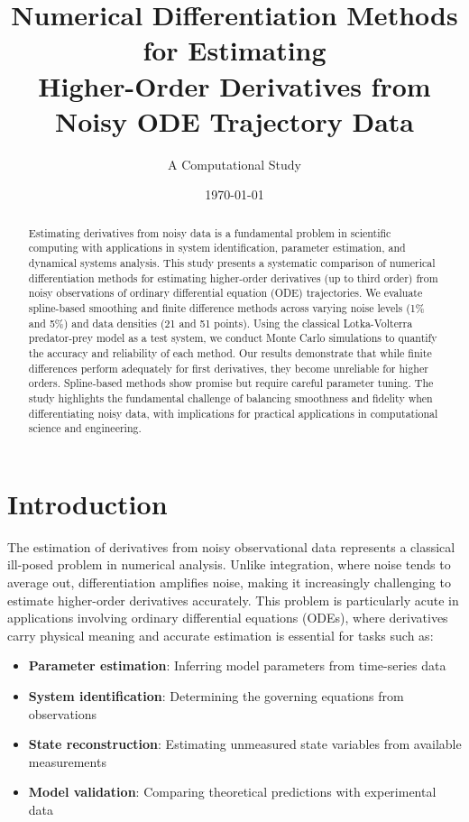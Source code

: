 \documentclass[11pt,a4paper]{article}
\title{Numerical Differentiation Methods for Estimating\\
Higher-Order Derivatives from Noisy ODE Trajectory Data}
\author{A Computational Study}
\date{\today}
\begin{document}
\maketitle

\begin{abstract}
Estimating derivatives from noisy data is a fundamental problem in scientific computing with applications in system identification, parameter estimation, and dynamical systems analysis. This study presents a systematic comparison of numerical differentiation methods for estimating higher-order derivatives (up to third order) from noisy observations of ordinary differential equation (ODE) trajectories. We evaluate spline-based smoothing and finite difference methods across varying noise levels (1\% and 5\%) and data densities (21 and 51 points). Using the classical Lotka-Volterra predator-prey model as a test system, we conduct Monte Carlo simulations to quantify the accuracy and reliability of each method. Our results demonstrate that while finite differences perform adequately for first derivatives, they become unreliable for higher orders. Spline-based methods show promise but require careful parameter tuning. The study highlights the fundamental challenge of balancing smoothness and fidelity when differentiating noisy data, with implications for practical applications in computational science and engineering.
\end{abstract}

\section{Introduction}

The estimation of derivatives from noisy observational data represents a classical ill-posed problem in numerical analysis. Unlike integration, where noise tends to average out, differentiation amplifies noise, making it increasingly challenging to estimate higher-order derivatives accurately. This problem is particularly acute in applications involving ordinary differential equations (ODEs), where derivatives carry physical meaning and accurate estimation is essential for tasks such as:

\begin{itemize}
    \item \textbf{Parameter estimation}: Inferring model parameters from time-series data
    \item \textbf{System identification}: Determining the governing equations from observations
    \item \textbf{State reconstruction}: Estimating unmeasured state variables from available measurements
    \item \textbf{Model validation}: Comparing theoretical predictions with experimental data
\end{itemize}
\end{document}
